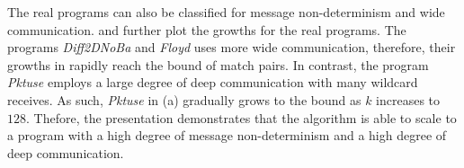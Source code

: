 The real programs can also be classified for message non-determinism and wide communication.  and  further plot the growths for the real programs. 
The programs \textit{Diff2DNoBa} and \textit{Floyd} uses more wide communication, therefore, their growths in  rapidly reach the bound of match pairs. In contrast, the program \textit{Pktuse} employs a large degree of deep communication with many wildcard receives. As such, \textit{Pktuse} in  (a) gradually grows to the bound as $k$ increases to $128$.
Thefore, the presentation demonstrates that the algorithm is able to scale to a program with a high degree of message non-determinism and a high degree of deep communication.


